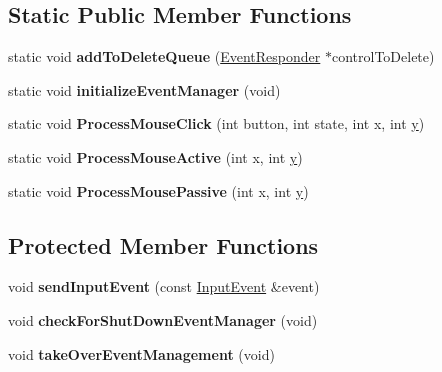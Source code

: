 \subsection*{Static Public Member Functions}
\begin{DoxyCompactItemize}
\item 
static void {\bfseries add\+To\+Delete\+Queue} (\hyperlink{classEventResponder}{Event\+Responder} $\ast$control\+To\+Delete)\hypertarget{classEventManager_a1a0da82f04f947ff598d6c9ffa02b5db}{}\label{classEventManager_a1a0da82f04f947ff598d6c9ffa02b5db}

\item 
static void {\bfseries initialize\+Event\+Manager} (void)\hypertarget{classEventManager_a0e94eab662a2acb79b853f75c37031ce}{}\label{classEventManager_a0e94eab662a2acb79b853f75c37031ce}

\item 
static void {\bfseries Process\+Mouse\+Click} (int button, int state, int x, int \hyperlink{IceUtils_8h_aa7ffaed69623192258fb8679569ff9ba}{y})\hypertarget{classEventManager_ae694afdd47a901faa369829dcb3a6f44}{}\label{classEventManager_ae694afdd47a901faa369829dcb3a6f44}

\item 
static void {\bfseries Process\+Mouse\+Active} (int x, int \hyperlink{IceUtils_8h_aa7ffaed69623192258fb8679569ff9ba}{y})\hypertarget{classEventManager_a15a4e944907bb17adabde9ff53ae04b6}{}\label{classEventManager_a15a4e944907bb17adabde9ff53ae04b6}

\item 
static void {\bfseries Process\+Mouse\+Passive} (int x, int \hyperlink{IceUtils_8h_aa7ffaed69623192258fb8679569ff9ba}{y})\hypertarget{classEventManager_a17bb3487b9debc365dd00a943a2d4c83}{}\label{classEventManager_a17bb3487b9debc365dd00a943a2d4c83}

\end{DoxyCompactItemize}
\subsection*{Protected Member Functions}
\begin{DoxyCompactItemize}
\item 
void {\bfseries send\+Input\+Event} (const \hyperlink{structInputEvent}{Input\+Event} \&event)\hypertarget{classEventManager_a677b00241d7074baeb2b95d2c216cbf1}{}\label{classEventManager_a677b00241d7074baeb2b95d2c216cbf1}

\item 
void {\bfseries check\+For\+Shut\+Down\+Event\+Manager} (void)\hypertarget{classEventManager_ad9c69182d6451f377d0c856f4d99e6d1}{}\label{classEventManager_ad9c69182d6451f377d0c856f4d99e6d1}

\item 
void {\bfseries take\+Over\+Event\+Management} (void)\hypertarget{classEventManager_a985f3640258bad937b619e81c2997419}{}\label{classEventManager_a985f3640258bad937b619e81c2997419}

\end{DoxyCompactItemize}
